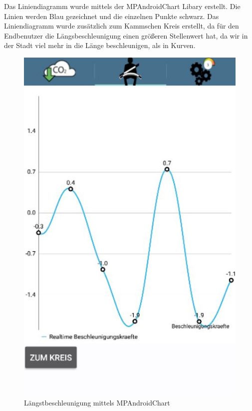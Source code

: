 Das Liniendiagramm wurde mittels der MPAndroidChart Libary erstellt. Die Linien werden Blau gezeichnet und die einzelnen Punkte schwarz. Das Liniendiagramm wurde zusätzlich zum Kammschen Kreis erstellt, da für den Endbenutzer die Längsbeschleunigung einen größeren Stellenwert hat, da wir in der Stadt viel mehr in die Länge beschleunigen, als in Kurven.
 \newline
\begin{figure}[!tbp]
 	\centering
 	\begin{minipage}[b]{0.4\textwidth}
 		\includegraphics[width=\textwidth]{images/Liniendiagramm}
 		\caption{Längstbeschleunigung mittels MPAndroidChart}
 	\end{minipage}

\end{figure}
